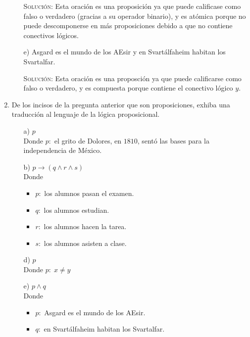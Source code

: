 \documentclass[letterpaper,11pt]{article}
\begin{document}
\begin{enumerate}
\begin{itemize}
        \textsc{Solución:} Esta oración es una proposición ya que puede 
        calificase como falso o verdadero (gracias a su operador binario), y es 
        atómica porque no puede descomponerse en más proposiciones debido a que 
        no contiene conectivos lógicos. 

        \item[e)] Asgard es el mundo de los AEsir y en Svartálfaheim habitan los 
        Svartalfar.

        \textsc{Solución:} Esta oración es una proposción ya que puede 
        calificarse como falso o verdadero, y es compuesta porque contiene el 
        conectivo lógico $y$. 
    \end{itemize}

    \item De los incisos de la pregunta anterior que son proposiciones, exhiba
    una traducción al lenguaje de la lógica proposicional.

    \begin{itemize}
        \item[a)] $p$ \\ 
        Donde $p:$ el grito de Dolores, en $1810$, sentó las bases para la 
        independencia de México.

        \item[b)] $p → (q \land r \land s)$ \\ 
        Donde 
        \begin{itemize}
            \item $p:$ los alumnos pasan el examen.
            \item $q:$ los alumnos estudian.
            \item $r:$ los alumnos hacen la tarea.
            \item $s:$ los alumnos asisten a clase.
        \end{itemize}
    
        \item[d)] $p$ \\ 
        Donde $p: \; x \neq y$
        \item[e)] $p \land q$ \\ 
        Donde 
        \begin{itemize}
            \item $p:$ Asgard es el mundo de los AEsir.
            \item $q:$ en Svartálfaheim habitan los Svartalfar.
        \end{itemize}
    \end{itemize}


\end{enumerate}
\end{document}
